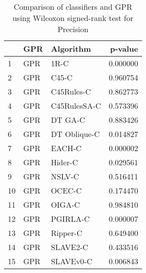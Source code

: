 \begin{table}
\footnotesize
\caption{Comparison of classifiers and GPR using Wilcoxon signed-rank test for Precision}
\label{tab:GPR wilcoxon Precision comparison}
\begin{tabular}{lllr}
\hline
 & GPR & Algorithm & p-value \\
\hline
1 & GPR & 1R-C & 0.000000 \\
2 & GPR & C45-C & 0.960754 \\
3 & GPR & C45Rules-C & 0.862773 \\
4 & GPR & C45RulesSA-C & 0.573396 \\
5 & GPR & DT GA-C & 0.883426 \\
6 & GPR & DT Oblique-C & 0.014827 \\
7 & GPR & EACH-C & 0.000002 \\
8 & GPR & Hider-C & 0.029561 \\
9 & GPR & NSLV-C & 0.516411 \\
10 & GPR & OCEC-C & 0.174470 \\
11 & GPR & OIGA-C & 0.984810 \\
12 & GPR & PGIRLA-C & 0.000007 \\
13 & GPR & Ripper-C & 0.649400 \\
14 & GPR & SLAVE2-C & 0.433516 \\
15 & GPR & SLAVEv0-C & 0.006843 \\
\hline
\end{tabular}
\end{table}
